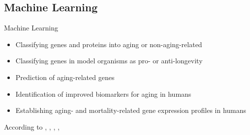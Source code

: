 \subsection{Machine Learning}

\begin{frame}[c]{Machine Learning}
    \large
    \begin{itemize}[<+(1)->]
        \item Classifying genes and proteins into aging or non-aging-related
        \item Classifying genes in model organisms as pro- or anti-longevity
        \item Prediction of aging-related genes
        \item Identification of improved biomarkers for aging in humans
        \item Establishing aging- and mortality-related gene expression profiles in humans
    \end{itemize}
    \footnotesize
    According to \cite{kruempel2019computational}, \cite{putin2016deep}, \cite{townes2020identifying}, \cite{kerber2009gene}, \cite{nakamura2007method}
\end{frame}


%




